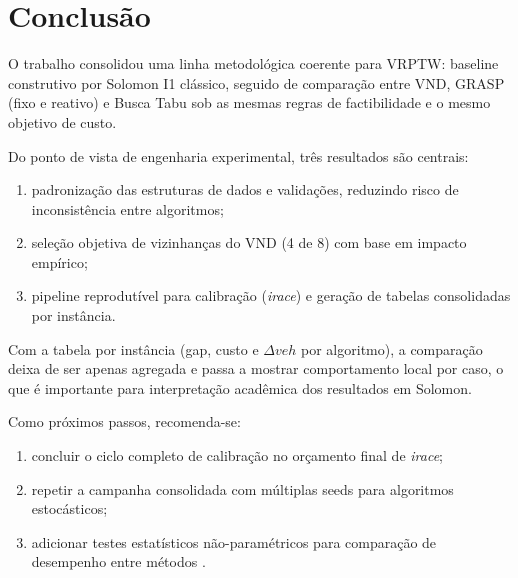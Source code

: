 \section{Conclusão}
\label{sec:conclusao}

O trabalho consolidou uma linha metodológica coerente para VRPTW: baseline construtivo por Solomon I1 clássico, seguido de comparação entre VND, GRASP (fixo e reativo) e Busca Tabu sob as mesmas regras de factibilidade e o mesmo objetivo de custo.

Do ponto de vista de engenharia experimental, três resultados são centrais:
\begin{enumerate}
  \item padronização das estruturas de dados e validações, reduzindo risco de inconsistência entre algoritmos;
  \item seleção objetiva de vizinhanças do VND (4 de 8) com base em impacto empírico;
  \item pipeline reprodutível para calibração (\emph{irace}) e geração de tabelas consolidadas por instância.
\end{enumerate}

Com a tabela por instância (gap, custo e $\Delta veh$ por algoritmo), a comparação deixa de ser apenas agregada e passa a mostrar comportamento local por caso, o que é importante para interpretação acadêmica dos resultados em Solomon.

Como próximos passos, recomenda-se:
\begin{enumerate}
  \item concluir o ciclo completo de calibração no orçamento final de \emph{irace};
  \item repetir a campanha consolidada com múltiplas seeds para algoritmos estocásticos;
  \item adicionar testes estatísticos não-paramétricos para comparação de desempenho entre métodos \cite{demsar2006statistical}.
\end{enumerate}
